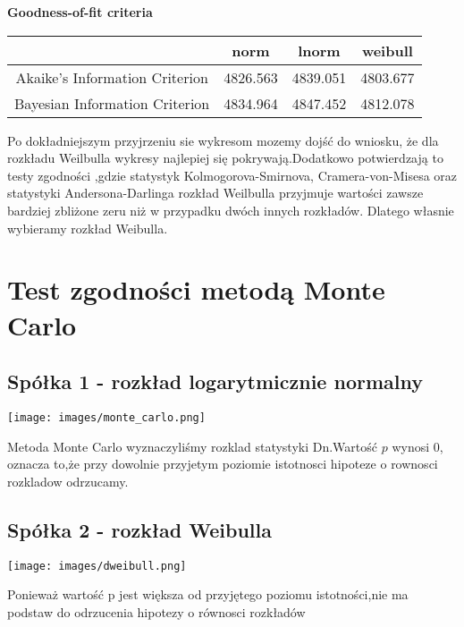 \documentclass[a4paper,11pt]{article}
\begin{document}
\begin{center} 
{\textbf{Goodness-of-fit criteria}}\\
\begin{tabular}{ |c | c | c| c | } 
  \hline
    &  norm &  lnorm &  weibull  \\ 
  \hline
  Akaike's Information Criterion & 4826.563  &  4839.051 & 4803.677 \\ 
  \hline
   Bayesian Information Criterion & 4834.964 & 4847.452  & 4812.078 \\ 
  \hline
 
\end{tabular}
\begin{flushleft}
{Po dokładniejszym przyjrzeniu sie wykresom mozemy dojść do wniosku, że dla rozkładu Weilbulla wykresy najlepiej się pokrywają.Dodatkowo potwierdzają to testy zgodności ,gdzie statystyk Kolmogorova-Smirnova, Cramera-von-Misesa oraz  statystyki Andersona-Darlinga rozkład Weilbulla przyjmuje wartości zawsze bardziej zbliżone zeru niż w przypadku dwóch innych rozkładów. Dlatego własnie wybieramy rozkład Weibulla.}
\end{flushleft}
\section{Test zgodności metodą Monte Carlo}
\subsection{Spółka 1 - rozkład logarytmicznie normalny}
\begin{center}
    \texttt{[image: images/monte\_carlo.png]}
\end{center}
\begin{flushleft}
{Metoda Monte Carlo wyznaczyliśmy rozklad statystyki Dn.Wartość $p$ wynosi 0, oznacza to,że przy dowolnie przyjetym poziomie istotnosci hipoteze o rownosci rozkladow odrzucamy.}
\end{flushleft}
\subsection{Spółka 2 - rozkład Weibulla}
\begin{center}
    \texttt{[image: images/dweibull.png]}
\end{center}
\begin{flushleft}
{Ponieważ wartość p jest większa od przyjętego poziomu istotności,nie ma podstaw do odrzucenia hipotezy o równosci rozkładów}
\end{flushleft}
\end{center}
\end{document}
